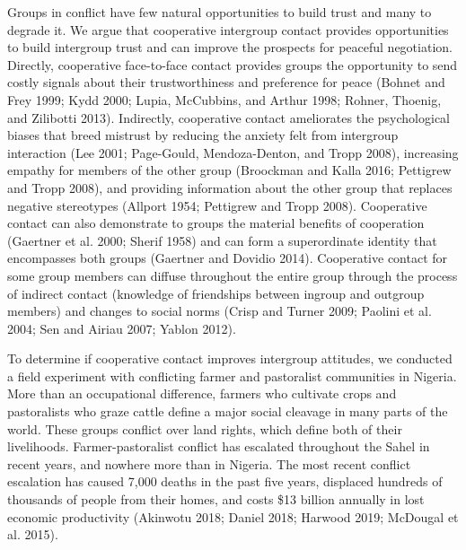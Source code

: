 \documentclass[11pt]{article}
\begin{document}
Groups in conflict have few natural opportunities to build trust and
many to degrade it. We argue that cooperative intergroup contact
provides opportunities to build intergroup trust and can improve the
prospects for peaceful negotiation. Directly, cooperative face-to-face
contact provides groups the opportunity to send costly signals about
their trustworthiness and preference for peace (Bohnet and Frey 1999;
Kydd 2000; Lupia, McCubbins, and Arthur 1998; Rohner, Thoenig, and
Zilibotti 2013). Indirectly, cooperative contact ameliorates the
psychological biases that breed mistrust by reducing the anxiety felt
from intergroup interaction (Lee 2001; Page-Gould, Mendoza-Denton, and
Tropp 2008), increasing empathy for members of the other group
(Broockman and Kalla 2016; Pettigrew and Tropp 2008), and providing
information about the other group that replaces negative stereotypes
(Allport 1954; Pettigrew and Tropp 2008). Cooperative contact can also
demonstrate to groups the material benefits of cooperation (Gaertner et
al. 2000; Sherif 1958) and can form a superordinate identity that
encompasses both groups (Gaertner and Dovidio 2014). Cooperative contact
for some group members can diffuse throughout the entire group through
the process of indirect contact (knowledge of friendships between
ingroup and outgroup members) and changes to social norms (Crisp and
Turner 2009; Paolini et al. 2004; Sen and Airiau 2007; Yablon 2012).

To determine if cooperative contact improves intergroup attitudes, we
conducted a field experiment with conflicting farmer and pastoralist
communities in Nigeria. More than an occupational difference, farmers
who cultivate crops and pastoralists who graze cattle define a major
social cleavage in many parts of the world. These groups conflict over
land rights, which define both of their livelihoods. Farmer-pastoralist
conflict has escalated throughout the Sahel in recent years, and nowhere
more than in Nigeria. The most recent conflict escalation has caused
7,000 deaths in the past five years, displaced hundreds of thousands of
people from their homes, and costs \$13 billion annually in lost
economic productivity (Akinwotu 2018; Daniel 2018; Harwood 2019;
McDougal et al. 2015).
\end{document}

